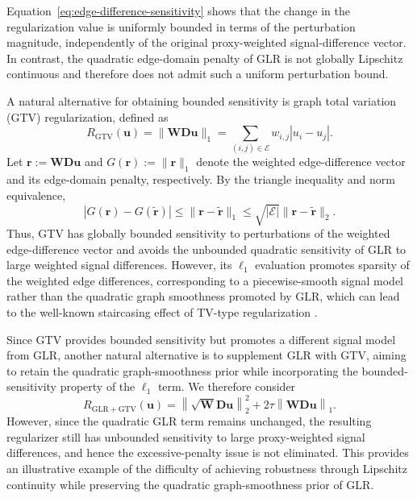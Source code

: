 Equation~\eqref{eq:edge-difference-sensitivity} shows that the change in the regularization value is uniformly bounded in terms of the perturbation magnitude, independently of the original proxy-weighted signal-difference vector.
In contrast, the quadratic edge-domain penalty of GLR is not globally Lipschitz continuous and therefore does not admit such a uniform perturbation bound.

A natural alternative for obtaining bounded sensitivity is graph total variation (GTV) regularization, defined as
\begin{equation}
R_{\mathrm{GTV}}(\mathbf{u})
=
\|\mathbf{W}\mathbf{D}\mathbf{u}\|_1
=
\sum_{(i,j)\in\mathcal{E}}
w_{i,j}|u_i-u_j|.
\label{eq:gtv}
\end{equation}
Let $\mathbf{r}:=\mathbf{W}\mathbf{D}\mathbf{u}$ and $G(\mathbf{r}):=\|\mathbf{r}\|_1$ denote the weighted edge-difference vector and its edge-domain penalty, respectively.
By the triangle inequality and norm equivalence,
\begin{equation}
\left|
G(\mathbf{r})
-
G(\widetilde{\mathbf{r}})
\right|
\leq
\|\mathbf{r}-\widetilde{\mathbf{r}}\|_1
\leq
\sqrt{|\mathcal{E}|}
\|\mathbf{r}-\widetilde{\mathbf{r}}\|_2.
\label{eq:gtv-lipschitz}
\end{equation}
Thus, GTV has globally bounded sensitivity to perturbations of the weighted edge-difference vector and avoids the unbounded quadratic sensitivity of GLR to large weighted signal differences.
However, its $\ell_1$ evaluation promotes sparsity of the weighted edge differences, corresponding to a piecewise-smooth signal model rather than the quadratic graph smoothness promoted by GLR, which can lead to the well-known staircasing effect of TV-type regularization \cite{Ono2015GraphTGV}.

Since GTV provides bounded sensitivity but promotes a different signal model from GLR, another natural alternative is to supplement GLR with GTV, aiming to retain the quadratic graph-smoothness prior while incorporating the bounded-sensitivity property of the $\ell_1$ term.
We therefore consider
\begin{equation}
R_{\mathrm{GLR+GTV}}(\mathbf{u})
=
\left\|
\sqrt{\mathbf{W}}\mathbf{D}\mathbf{u}
\right\|_2^2
+
2\tau
\left\|
\mathbf{W}\mathbf{D}\mathbf{u}
\right\|_1.
\label{eq:glr-gtv}
\end{equation}
However, since the quadratic GLR term remains unchanged, the resulting regularizer still has unbounded sensitivity to large proxy-weighted signal differences, and hence the excessive-penalty issue is not eliminated.
This provides an illustrative example of the difficulty of achieving robustness through Lipschitz continuity while preserving the quadratic graph-smoothness prior of GLR.

